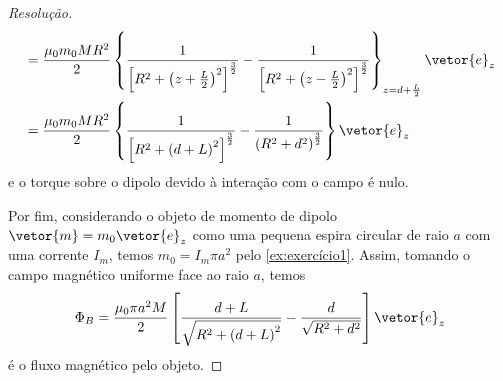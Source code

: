 \begin{proof}[Resolução]
\begin{align*}
                  &= \frac{\mu_0 m_0M R^2}{2}\left\{\frac{1}{\left[R^2 + \left(z + \frac{L}{2}\right)^2\right]^{\frac32}} - \frac{1}{\left[R^2 + \left(z - \frac{L}{2}\right)^2\right]^{\frac32}}\right\}_{z = d +\frac{L}{2}}\vetor{e}_z\\
                  &= \frac{\mu_0 m_0M R^2}{2}\left\{\frac{1}{\left[R^2 + \left(d + L\right)^2\right]^{\frac32}} - \frac{1}{\left(R^2 + d^2\right)^{\frac32}}\right\}\vetor{e}_z
    \end{align*}
    e o torque sobre o dipolo devido à interação com o campo é nulo.

    Por fim, considerando o objeto de momento de dipolo \(\vetor{m} = m_0 \vetor{e}_z\) como uma pequena espira circular de raio \(a\) com uma corrente \(I_m\), temos \(m_0 = I_m \pi a^2\) pelo \cref{ex:exercício1}. Assim, tomando o campo magnético uniforme face ao raio \(a\), temos
    \begin{equation*}
        \Phi_B = \frac{\mu_0 \pi a^2 M}{2}\left[\frac{d + L}{\sqrt{R^2 + \left(d + L\right)^2}} - \frac{d}{\sqrt{R^2 + d^2}}\right]\vetor{e}_z
    \end{equation*}
    é o fluxo magnético pelo objeto.
\end{proof}
